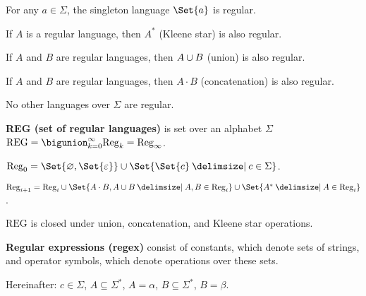\documentclass[a4paper,10pt]{article}
\begin{document}
\begin{terms}
\begin{terms}
        \item For any $a \in \Sigma$, the singleton language $\Set{a}$ is regular.

        \item If $A$ is a regular language, then $A^*$ (Kleene star) is also regular.

        \item If $A$ and $B$ are regular languages, then $A \cup B$ (union) is also regular.

        \item If $A$ and $B$ are regular languages, then $A \cdot B$ (concatenation) is also regular.

        \item No other languages over $\Sigma$ are regular.
    \end{terms}

    \item \textbf{REG (set of regular languages)} is set over an alphabet $\Sigma$\\ $\mathrm{REG} = \bigunion_{k = 0}^{\infty} \mathrm{Reg}_{k} = \mathrm{Reg}_{\infty}$.

    \begin{terms}
        \item $\mathrm{Reg}_{0} = \Set{\emptyset, \Set{\varepsilon}} \union \Set{\Set{c} \given c \in \Sigma}$.

        \item $\mathrm{Reg}_{i + 1} = \mathrm{Reg}_{i} \union \Set{A \cdot B, A \union B \given A,B \in \mathrm{Reg}_{i}} \union \Set{A^* \given A \in \mathrm{Reg}_{i}}$.
    \end{terms}

    \item $\mathrm{REG}$ is closed under union, concatenation, and Kleene star operations.

    \item \textbf{Regular expressions (regex)} consist of constants, which denote sets of strings, and operator symbols, which denote operations over these sets.

    Hereinafter: $c \in \Sigma$, $A \subseteq \Sigma^*$, $A = \alpha$,  $B \subseteq \Sigma^*$, $B = \beta$.


\end{terms}
\end{document}
